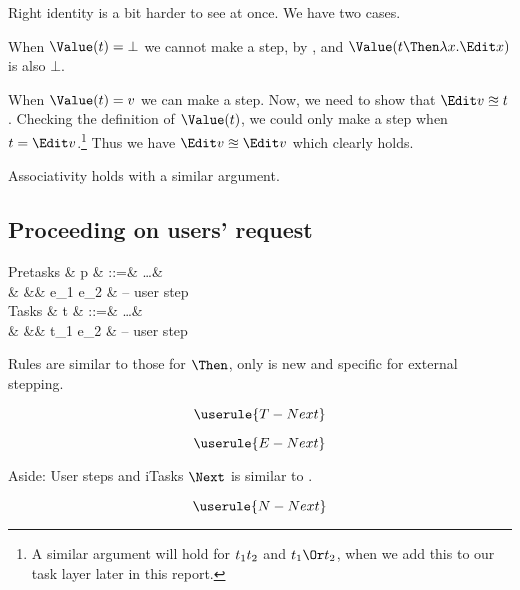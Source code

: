 Right identity is a bit harder to see at once.
We have two cases.
\begin{enumerate*}
  \item
    When $\Value(t) = \bot$ we cannot make a step, by ,
    and $\Value(t \Then \lambda x. \Edit x)$ is also $\bot$.
  \item
    When $\Value(t) = v$ we can make a step.
    Now, we need to show that $\Edit v \approxeq t$.
    Checking the definition of $\Value(t)$,
    we could only make a step when $t = \Edit v$.\footnote{
      A similar argument will hold for $t_1 \relax t_2$ and $t_1 \Or t_2$,
      when we add this to our task layer later in this report.
    }
    Thus we have $\Edit v \approxeq \Edit v$ which clearly holds.
\end{enumerate*}

Associativity holds with a similar argument.


\subsection{Proceeding on users' request}

\begin{grammar}
  Pretasks
    & p & ::=& \ldots        & \\
    &   &\mid& e_1 \Next e_2 & – user step \\
  Tasks
    & t & ::=& \ldots        & \\
    &   &\mid& t_1 \Next e_2 & – user step \\
\end{grammar}

Rules are similar to those for $\Then$,
only  is new and specific for external stepping.

\begin{equation*}
  \userule{T-Next}
\end{equation*}

\begin{equation*}
  \userule{E-Next}
\end{equation*}

\begin{margintext}{Aside: User steps and iTasks}
  $\Next$ is similar to \type{>>=}.
\end{margintext}

\begin{equation*}
  \userule{N-Next}
\end{equation*}

